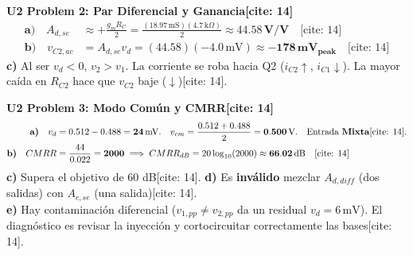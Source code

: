 \documentclass[11pt, a4paper]{article}
\begin{document}
\vspace{0.2cm}
\textbf{U2 Problem 2: Par Diferencial y Ganancia[cite: 14]}
\begin{align*}
    \textbf{a)} \quad A_{d,se} &\approx +\frac{g_m R_C}{2} = \frac{(18.97\,\text{mS})(4.7\,\text{k}\Omega)}{2} \approx \mathbf{44.58\,\text{V/V}} \quad \text{[cite: 14]} \\
    \textbf{b)} \quad v_{C2,ac} &= A_{d,se} v_d = (44.58)(-4.0\,\text{mV}) \approx \mathbf{-178\,\text{mV}_{peak}} \quad \text{[cite: 14]}
\end{align*}
\textbf{c)} Al ser $v_d < 0$, $v_2 > v_1$. La corriente se roba hacia Q2 ($i_{C2} \uparrow$, $i_{C1} \downarrow$). La mayor caída en $R_{C2}$ hace que $v_{C2}$ baje ($\downarrow$)[cite: 14].

\vspace{0.2cm}
\textbf{U2 Problem 3: Modo Común y CMRR[cite: 14]}
\begin{align*}
    \textbf{a)} \quad v_d &= 0.512 - 0.488 = \mathbf{24\,\text{mV}}. \quad v_{cm} = \frac{0.512 + 0.488}{2} = \mathbf{0.500\,\text{V}}. \quad \text{Entrada \textbf{Mixta}[cite: 14].} \\
    \textbf{b)} \quad CMRR &= \frac{44}{0.022} = \mathbf{2000} \implies CMRR_{dB} = 20\log_{10}(2000) \approx \mathbf{66.02\,\text{dB}} \quad \text{[cite: 14]}
\end{align*}
\textbf{c)} Supera el objetivo de 60 dB[cite: 14]. \textbf{d)} Es \textbf{inválido} mezclar $A_{d,diff}$ (dos salidas) con $A_{c,se}$ (una salida)[cite: 14]. \\
\textbf{e)} Hay contaminación diferencial ($v_{1,pp} \neq v_{2,pp}$ da un residual $v_d = 6\,\text{mV}$). El diagnóstico es revisar la inyección y cortocircuitar correctamente las bases[cite: 14].
\end{document}
